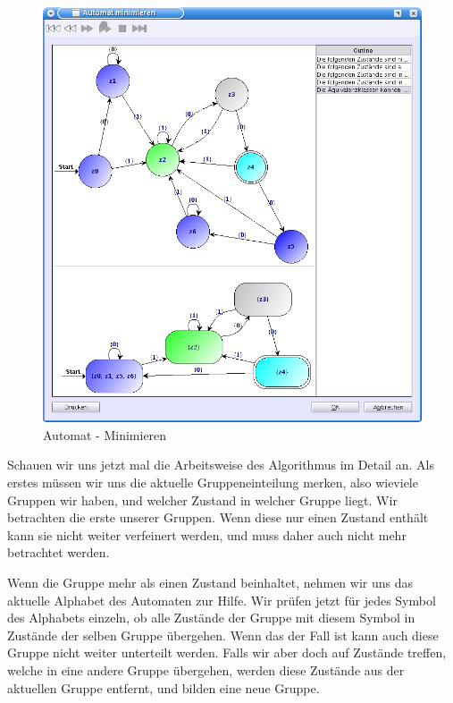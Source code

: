 \begin{figure}[h]
\begin{center}
\includegraphics[width=12cm]{../images/minimize.png}
\caption{Automat - Minimieren}
\end{center}
\end{figure}
\vspace{10pt}

Schauen wir uns jetzt mal die Arbeitsweise des Algorithmus im Detail an. Als
erstes müssen wir uns die aktuelle Gruppeneinteilung merken, also wieviele
Gruppen wir haben, und welcher Zustand in welcher Gruppe liegt. Wir betrachten
die erste unserer Gruppen. Wenn diese nur einen Zustand enthält kann sie nicht
weiter verfeinert werden, und muss daher auch nicht mehr betrachtet werden.
\vspace{10pt}

Wenn die Gruppe mehr als einen Zustand beinhaltet, nehmen wir uns das aktuelle
Alphabet des Automaten zur Hilfe. Wir prüfen jetzt für jedes Symbol des Alphabets
einzeln, ob alle Zustände der Gruppe mit diesem Symbol in Zustände der selben
Gruppe übergehen. Wenn das der Fall ist kann auch diese Gruppe nicht weiter
unterteilt werden. Falls wir aber doch auf Zustände treffen, welche in eine
andere Gruppe übergehen, werden diese Zustände aus der aktuellen Gruppe entfernt,
und bilden eine neue Gruppe. \vspace{10pt}

